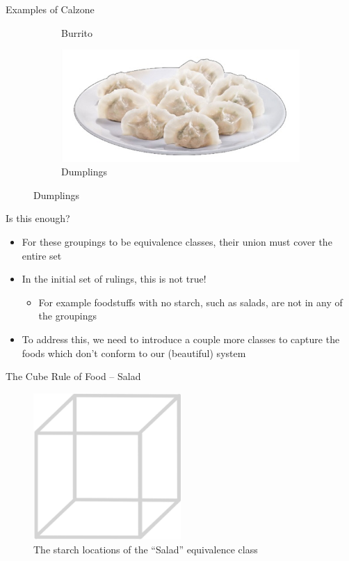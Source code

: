 \documentclass{beamer}
\begin{document}
\begin{frame}{Examples of Calzone}
\begin{figure}
\begin{subfigure}{.4\textwidth}
          \caption{\label{fig:burrito}Burrito}
        \end{subfigure}%
        \begin{subfigure}{.4\textwidth}
          \centering
          \includegraphics[width=.8\linewidth]{images/cube_rule_of_food/calzone/28_dumplings.jpg}
          \caption{\label{fig:dumplings}Dumplings}
        \end{subfigure}
    \end{figure}
\end{frame}

\begin{frame}{Is this enough?}
    \begin{itemize}
        \item For these groupings to be equivalence classes, their union must cover the entire set
        \item In the initial set of rulings, this is not true!
        \begin{itemize}
            \item For example foodstuffs with no starch, such as salads, are not in any of the groupings
        \end{itemize}
        \item To address this, we need to introduce a couple more classes to capture the foods which don't conform to our (beautiful) system
    \end{itemize}
\end{frame}

\begin{frame}{The Cube Rule of Food -- Salad}
    \begin{figure}
        \includegraphics[width=0.5\textwidth]{images/cube_rule_of_food/salad/29_salad.jpg}
        \caption{\label{fig:salad-diagram}The starch locations of the ``Salad'' equivalence class}
    \end{figure}
\end{frame}
\end{document}
